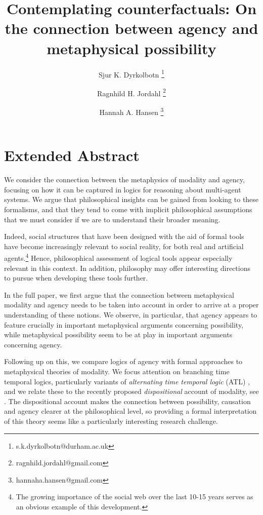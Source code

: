 \documentclass{article}
\begin{document}
\title{Contemplating counterfactuals: On the connection between agency and metaphysical possibility}
\author[1]{Sjur K. Dyrkolbotn \thanks{s.k.dyrkolbotn@durham.ac.uk}}
\author[2]{Ragnhild H. Jordahl \thanks{ragnhild.jordahl@gmail.com}}
\author[3]{Hannah A. Hansen \thanks{hannaha.hansen@gmail.com}}

\date{}
\maketitle

\section*{Extended Abstract}

We consider the connection between the metaphysics of modality and agency, focusing on how it can be captured in logics for reasoning about multi-agent systems. We argue that philosophical insights can be gained from looking to these formalisms, and that they tend to come with implicit philosophical assumptions that we must consider if we are to understand their broader meaning.

Indeed, social structures that have been designed with the aid of formal tools have become increasingly relevant to social reality, for both real and artificial agents.\footnote{The growing importance of the social web over the last 10-15 years serves as an obvious example of this development.} Hence, philosophical assessment of logical tools appear especially relevant in this context. In addition, philosophy may offer interesting directions to pursue when developing these tools further.

In the full paper, we first argue that the connection between metaphysical modality and agency needs to be taken into account in order to arrive at a proper understanding of these notions. We observe, in particular, that agency appears to feature crucially in important metaphysical arguments concerning possibility, while metaphysical possibility seem to be at play in important arguments concerning agency.

Following up on this, we compare logics of agency with formal approaches to metaphysical theories of modality. We focus attention on branching time temporal logics, particularly variants of \emph{alternating time temporal logic} (ATL) \cite{atl}, and we relate these to the recently proposed \emph{dispositional} account of modality, see \cite{dispmod,MwPw}. The dispositional account makes the connection between possibility, causation and agency clearer at the philosophical level, so providing a formal interpretation of this theory seems like a particularly interesting research challenge.
\end{document}
